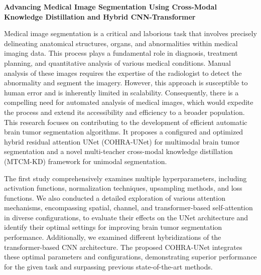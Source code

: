 \newcommand{\thesisTitleEnglish}{Advancing Medical Image Segmentation Using Cross-Modal Knowledge Distillation and Hybrid CNN-Transformer}

{\centering \Large \bf \thesisTitleEnglish \par} \vspace{1.0cm}

Medical image segmentation is a critical and laborious task that involves precisely delineating anatomical structures, organs, and abnormalities within medical imaging data. This process plays a fundamental role in diagnosis, treatment planning, and quantitative analysis of various medical conditions. Manual analysis of these images requires the expertise of the radiologist to detect the abnormality and segment the imagery. However, this approach is susceptible to human error and is inherently limited in scalability. Consequently, there is a compelling need for automated analysis of medical images, which would expedite the process and extend its accessibility and efficiency to a broader population. This research focuses on contributing to the development of efficient automatic brain tumor segmentation algorithms. It proposes a configured and optimized hybrid residual attention UNet (COHRA-UNet) for multimodal brain tumor segmentation and a novel multi-teacher cross-modal knowledge distillation (MTCM-KD) framework for unimodal segmentation. 

The first study comprehensively examines multiple hyperparameters, including activation functions, normalization techniques, upsampling methods, and loss functions. We also conducted a detailed exploration of various attention mechanisms, encompassing spatial, channel, and transformer-based self-attention in diverse configurations, to evaluate their effects on the UNet architecture and identify their optimal settings for improving brain tumor segmentation performance. Additionally, we examined different hybridizations of the transformer-based CNN architecture. The proposed COHRA-UNet integrates these optimal parameters and configurations, demonstrating superior performance for the given task and surpassing previous state-of-the-art methods.

